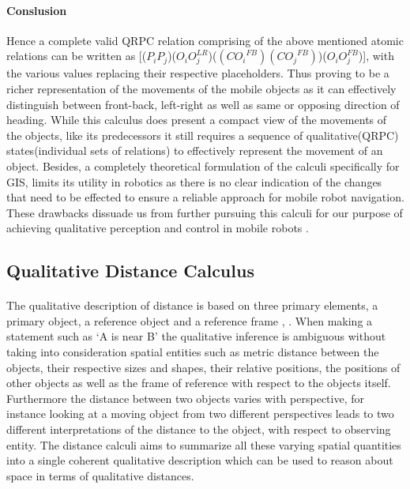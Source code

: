 	\paragraph{Conslusion}Hence a complete valid QRPC relation comprising of the above mentioned atomic relations can be written as [($P_iP_j$)($O_iO_j^{LR}$)($({CO_i}^{FB})({CO_j}^{FB})$)($O_iO_j^{FB}$)], with the various values replacing their respective placeholders. Thus proving to be a richer representation of the movements of the mobile objects as it can effectively distinguish  between front-back, left-right as well as same or opposing direction of heading. While this calculus does present a compact view of the movements of the objects, like its predecessors it still requires a sequence of qualitative(QRPC) states(individual sets of relations) to effectively represent the movement of an object. Besides, a completely theoretical formulation of the calculi specifically for GIS, limits its utility in robotics as there is no clear indication of the changes that need to be effected to ensure a reliable approach for mobile robot navigation. These drawbacks dissuade us from further pursuing this calculi for our purpose of achieving qualitative perception and control in mobile robots \cite{glez2013qrpc}. 
	
	\subsection{Qualitative Distance Calculus}
	\paragraph{} The qualitative description of distance is based on three primary elements, a primary object, a reference object and a reference frame \cite{clementini1997qualitative}, \cite{zimmermann1996qualitative}. When making a statement such as `A is near B' the qualitative inference is ambiguous without taking into consideration spatial entities such as metric distance between the objects, their respective sizes and shapes, their relative positions, the positions of other objects as well as the frame of reference with respect to the objects itself. Furthermore the distance between two objects varies with perspective, for instance looking at a moving object from two different perspectives leads to two different interpretations of the distance to the object, with respect to observing entity. The distance calculi aims to summarize all these varying spatial quantities into a single coherent qualitative description which can be used to reason about space in terms of qualitative distances.
